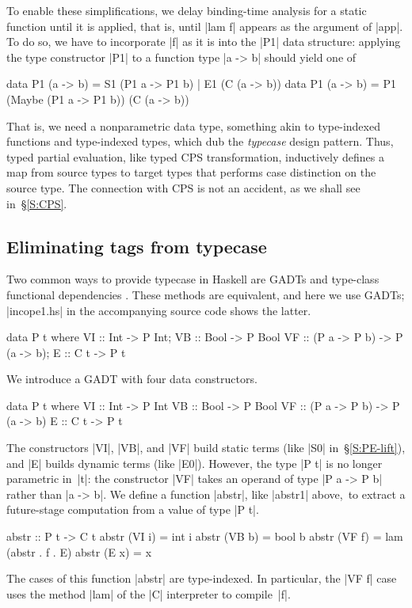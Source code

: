 To enable these simplifications, we delay binding-time analysis
for a static function until it is applied, that is, until |lam f|
appears as the argument of |app|.  To do so, we have to incorporate |f|
as it is into the |P1| data structure: applying the type constructor
|P1| to a function type |a -> b| should yield one of
\ifshort\vspace*{-0.7em}\fi
\begin{code}
data P1 (a -> b) = S1 (P1 a -> P1 b) | E1 (C (a -> b))
data P1 (a -> b) = P1 (Maybe (P1 a -> P1 b)) (C (a -> b))
\end{code}
\ifshort\vspace*{-0.7em}\fi
That is, we need a nonparametric data type, something akin to
type-indexed functions and type-indexed types, which
\citet{oliveira-typecase} dub the \emph{typecase} design pattern.
Thus, typed partial evaluation, like typed CPS transformation,
inductively defines a map from source types to target types that
performs case distinction on the source type.
\ifshort\else The connection with CPS
is not an accident, as we shall see in~\S\ref{S:CPS}.\fi

\subsection{Eliminating tags from typecase}
\label{S:PE-GADT}

Two common ways to provide typecase in Haskell are
GADTs and type-class functional dependencies
\cite{oliveira-typecase}.  These
methods are equivalent, and here we use GADTs; |incope1.hs|
in the accompanying source code shows the latter.
\ifshort
\vspace*{-0.7em}
\begin{code3}
data P t where
  VI :: Int  -> P Int;                VB :: Bool -> P Bool
  VF :: (P a -> P b) -> P (a -> b);   E  :: C t -> P t
\end{code3}
\vspace*{-0.7em}
\else
We introduce a GADT with four data constructors.
\begin{code}
data P t where
  VI :: Int  -> P Int
  VB :: Bool -> P Bool
  VF :: (P a -> P b) -> P (a -> b)
  E  :: C t -> P t
\end{code}
\fi
The constructors |VI|, |VB|, and |VF| build static terms (like |S0|
in~\S\ref{S:PE-lift}), and |E| builds dynamic terms (like |E0|).  However,
the type |P t| is no longer parametric in~|t|: the constructor |VF| takes an
operand of type |P a -> P b| rather than |a -> b|. We define a function
\ifshort |abstr|, \fi like |abstr1| above\ifshort,\fi\
to extract a future-stage computation from a value of type |P t|.
\ifshort\else
\begin{code}
abstr :: P t -> C t
abstr (VI i) = int i
abstr (VB b) = bool b
abstr (VF f) = lam (abstr . f . E)
abstr (E x)  = x
\end{code}
The cases of this function |abstr| are type-indexed.  In particular, the |VF f|
case uses the method |lam| of the |C| interpreter to compile~|f|.

